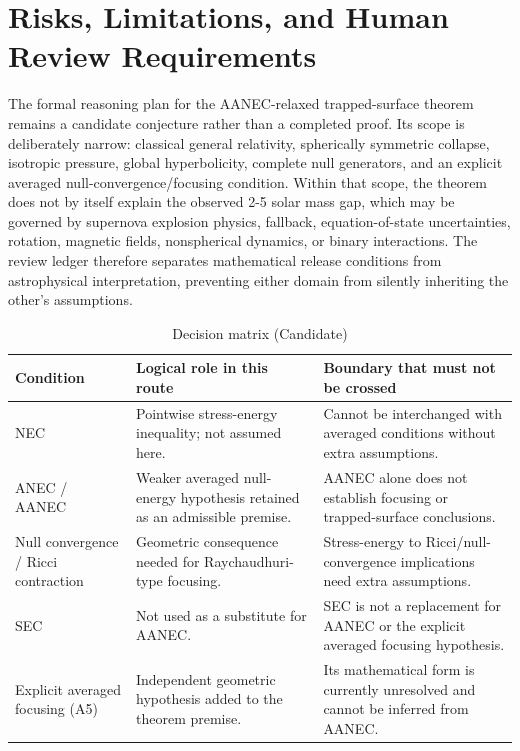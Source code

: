 \documentclass[conference]{IEEEtran}
\begin{document}
\section{Risks, Limitations, and Human Review Requirements}
The formal reasoning plan for the AANEC-relaxed trapped-surface theorem remains a candidate conjecture rather than a completed proof. Its scope is deliberately narrow: classical general relativity, spherically symmetric collapse, isotropic pressure, global hyperbolicity, complete null generators, and an explicit averaged null-convergence/focusing condition. Within that scope, the theorem does not by itself explain the observed 2-5 solar mass gap, which may be governed by supernova explosion physics, fallback, equation-of-state uncertainties, rotation, magnetic fields, nonspherical dynamics, or binary interactions. The review ledger therefore separates mathematical release conditions from astrophysical interpretation, preventing either domain from silently inheriting the other's assumptions.~\cite{cite_0ed84243cf171bc4}

\begin{table}[htbp]
\centering
\footnotesize
\setlength{\tabcolsep}{3pt}
\renewcommand{\arraystretch}{1.12}
\caption{Decision matrix (Candidate)}
\label{tab:risk-limitations-and-review-rlr-energy-taxonomy}
\begin{tabular}{|p{}|p{}|p{}|}
\hline
Condition & Logical role in this route & Boundary that must not be crossed \\\hline
NEC & Pointwise stress-energy inequality; not assumed here. & Cannot be interchanged with averaged conditions without extra assumptions. \\\hline
ANEC / AANEC & Weaker averaged null-energy hypothesis retained as an admissible premise. & AANEC alone does not establish focusing or trapped-surface conclusions. \\\hline
Null convergence / Ricci contraction & Geometric consequence needed for Raychaudhuri-type focusing. & Stress-energy to Ricci/null-convergence implications need extra assumptions. \\\hline
SEC & Not used as a substitute for AANEC. & SEC is not a replacement for AANEC or the explicit averaged focusing hypothesis. \\\hline
Explicit averaged focusing (A5) & Independent geometric hypothesis added to the theorem premise. & Its mathematical form is currently unresolved and cannot be inferred from AANEC. \\\hline
\end{tabular}
\end{table}~\cite{cite_0ed84243cf171bc4}
\end{document}

